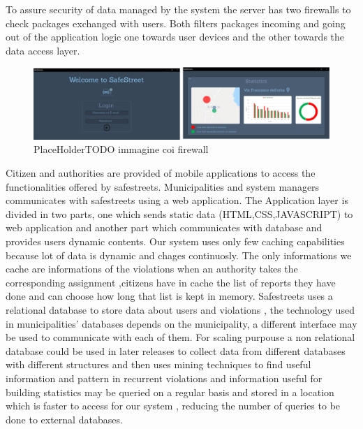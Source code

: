 To assure security of data managed by the system the server has two firewalls to check packages exchanged with users. Both filters packages incoming and going out of the application logic one towards user devices and the other towards the data access layer.
\begin{figure}[h]
\centering
\includegraphics[width=\textwidth]{Images/desktop_common_interface.png}
\caption{\label{fig:ComWI}PlaceHolderTODO immagine coi firewall}
\end{figure}
Citizen and authorities are provided of mobile applications to access the functionalities offered by safestreets. Municipalities and system managers communicates with safestreets using a web application.
The Application layer is divided in two parts, one which sends static data (HTML,CSS,JAVASCRIPT) to web application and another part which communicates with database and provides users dynamic contents.
Our system uses only few caching capabilities because lot of data is dynamic and chages continuosly. The only informations we cache are informations of the violations when an authority takes the corresponding assignment ,citizens have in cache the list of reports they have done and can choose how long that list is kept in memory.
Safestreets uses a relational database to store data about users and violations , the technology used in municipalities' databases depends on the municipality, a different interface may be used to communicate with each of them. For scaling purpouse a non relational database could be used in later releases to collect data from different databases with different structures and then uses mining techniques to find useful information and pattern in recurrent violations and information useful for building statistics may be queried on a regular basis and stored in a location which is faster to access for our system , reducing the number of queries to be done to external databases. 


